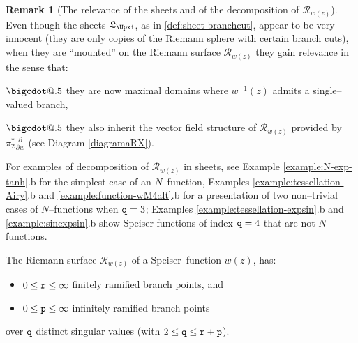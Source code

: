 \documentclass[final,3p,times]{elsarticle}
\makeatletter
\newcommand{\R}{\ensuremath{{\mathcal R}}}
\newcommand{\del}[2]{\frac{\partial #1}{\partial #2}}
\newcommand*\bigcdot{\mathpalette\bigcdot@{.5}}
\newcommand*\bigcdot@[2]{\mathbin{\vcenter{\hbox{\scalebox{#2}{$\m@th#1\bullet$}}}}}
\theoremstyle{definition}
\newtheorem{remark}[theorem]{Remark}
\makeatother
\begin{document}
\begin{remark}[The relevance of the sheets and of the decomposition of $\R_{w(z)}$]
Even though the sheets $\mathfrak{L}_{\Upxi}$, as in \eqref{def:sheet-branchcut}, 
appear to be very innocent (they are only copies of the Riemann sphere with certain 
branch cuts),
when they are ``mounted'' on the Riemann surface $\R_{w(z)}$ they gain relevance
in the sense that: 

\noindent
$\bigcdot$
they are now maximal domains where $w^{-1}(z)$ admits a 
single--valued branch,

\noindent
$\bigcdot$
they also inherit the vector field structure of $\R_{w(z)}$ provided by $\pi_2^* \del{}{w}$ 
(see Diagram \eqref{diagramaRX}).
\end{remark}



For examples of decomposition of $\R_{w(z)}$ in sheets, 
see Example \ref{example:N-exp-tanh}.b for the simplest case of an $N$--function, 
Examples \ref{example:tessellation-Airy}.b and \ref{example:function-wM4alt}.b 
for a presentation of two non--trivial cases of $N$--functions when ${\tt q} = 3$;
Examples \ref{example:tessellation-expsin}.b and \ref{example:sinexpsin}.b 
show Speiser functions of index ${\tt q}=4$ that are not $N$--functions.

\smallskip
\noindent
The Riemann surface $\R_{w(z)}$ of a Speiser--function $w(z)$, has:
\begin{itemize}[label=$\bigcdot$ ,leftmargin=*]
\item 
$0\leq{\tt r}\leq\infty$ finitely ramified branch points, and 

\item 
$0\leq{\tt p}\leq\infty$ infinitely ramified branch points 
\end{itemize}

\noindent
over ${\tt q}$ distinct singular values (with 
$2\leq {\tt q} \leq {\tt r} + {\tt p}$).
\end{document}
